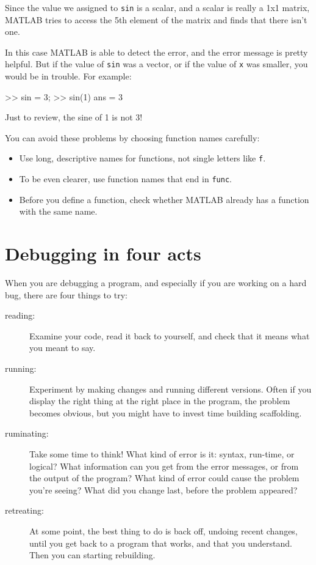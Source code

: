\documentclass[
]{book}
\numberwithin{Answer}{chapter}
\numberwithin{Exercise}{chapter}
\begin{document}
Since the value we assigned to {\tt sin}
is a scalar, and a scalar is really a 1x1 matrix, MATLAB tries to
access the 5th element of the matrix and finds that there isn't one.

In this case MATLAB is able to detect the error, and the error message is pretty helpful.
But if the value of {\tt sin} was a vector, or if the value of {\tt x} was smaller, you would be in trouble.  For example:

\begin{code}
>> sin = 3;
>> sin(1)
ans = 3
\end{code}

Just to review, the sine of 1 is not 3!

You can avoid these problems by choosing function names carefully:

\begin{itemize}

\item Use long, descriptive names for functions, not single letters like {\tt f}.

\item To be even clearer, use function names that end in {\tt func}.

\item Before you define a function, check whether MATLAB already has a function with the same name.

\end{itemize}


\section{Debugging in four acts}

When you are debugging a program, and especially if you are working on a hard bug, there are four things to try:

\begin{description}

\item[reading:] Examine your code, read it back to yourself, and
check that it means what you meant to say.

\item[running:] Experiment by making changes and running different
versions.  Often if you display the right thing at the right place
in the program, the problem becomes obvious, but you might have to invest time building scaffolding.

\item[ruminating:] Take some time to think!  What kind of error
is it: syntax, run-time, or logical?  What information can you get from
the error messages, or from the output of the program?  What kind of
error could cause the problem you're seeing?  What did you change
last, before the problem appeared?

\item[retreating:] At some point, the best thing to do is back
off, undoing recent changes, until you get back to a program that
works, and that you understand.  Then you can starting rebuilding.

\end{description}
\end{document}
